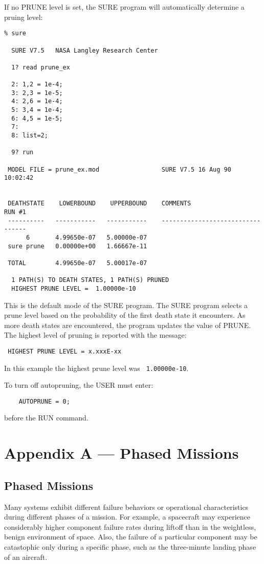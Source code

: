 If no {\isf PRUNE} level is set, the SURE program will automatically determine
a pruing level:
\begin{verbatim}
% sure

  SURE V7.5   NASA Langley Research Center

  1? read prune_ex

  2: 1,2 = 1e-4;
  3: 2,3 = 1e-5;
  4: 2,6 = 1e-4;
  5: 3,4 = 1e-4;
  6: 4,5 = 1e-5;
  7: 
  8: list=2;

  9? run

 MODEL FILE = prune_ex.mod                  SURE V7.5 16 Aug 90   10:02:42


 DEATHSTATE    LOWERBOUND    UPPERBOUND    COMMENTS                 RUN #1
 ----------   -----------   -----------    ---------------------------------
      6       4.99650e-07   5.00000e-07
 sure prune   0.00000e+00   1.66667e-11

 TOTAL        4.99650e-07   5.00017e-07

  1 PATH(S) TO DEATH STATES, 1 PATH(S) PRUNED
  HIGHEST PRUNE LEVEL =  1.00000e-10
\end{verbatim}
This is the default mode of the SURE program.
The SURE program selects a prune level based on the probability of the first
death state it encounters.  As more death states are encountered, the program
updates the value of {\isf PRUNE.}  The highest level of pruning is reported
with the message:
\begin{verbatim}  
 HIGHEST PRUNE LEVEL = x.xxxE-xx
\end{verbatim}  
In this example the highest prune level was \verb| 1.00000e-10|.

To turn off autopruning, the USER must enter:
\begin{verbatim} 
    AUTOPRUNE = 0;
\end{verbatim} 
before the {\isf RUN} command. \\

\appendix
\section{Appendix A --- Phased Missions}

\subsection{Phased Missions}

     Many systems exhibit different failure behaviors or operational 
characteristics during different phases of a mission.  For example, 
a spacecraft may experience considerably higher component failure rates
during liftoff than in the weightless, benign environment of space.  Also,
the failure of a particular component may be catastophic only 
during a specific phase, such as the three-minute landing phase of an 
aircraft.

